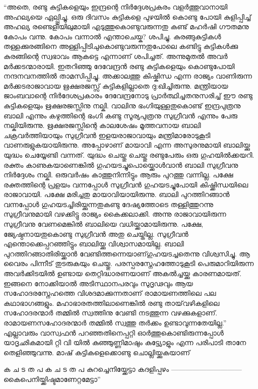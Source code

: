 “അതെ, രണ്ടു കുട്ടികളെയും ഇന്ദ്രന്റെ നിർദ്ദേശപ്രകരം വളർത്തുവാനായി അഹല്യയെ ഏല്പ്പിച്ചു. ഒരു ദിവസം കുട്ടികളെ പുഴയിൽ കൊണ്ടു പോയി കുളിപ്പിച്ച് അഹല്യ രണ്ടെളിയിലുമായി എടുത്തുകൊണ്ടുവരുന്നതു കണ്ട് മഹർഷി ഗൗതമനു കോപം വന്നു. കോപം വന്നാൽ എന്താചെയ്ക? ശപിച്ചു. കുരങ്ങുകുട്ടികൾ തള്ളക്കുരങ്ങിനെ അള്ളിപ്പിടിചുകൊണ്ടുവരുന്നതുപോലെ കണ്ടിട്ടു കുട്ടികൾക്കു കുരങ്ങിന്റെ സ്വഭാവം ആകട്ടെ എന്നാണ്‌ ശപിച്ചത്. അന്നുമുതൽ അവർ മർക്കടന്മാരായി. ഇതറിഞ്ഞു ദേവേന്ദ്രൻ രണ്ടു കുട്ടികളെയും കൊണ്ടുപോയി നന്ദനവനത്തിൽ താമസിപ്പിച്ചു. അക്കാലത്തു കിഷ്കിന്ധ എന്ന രാജ്യം വാണിരുന്ന മർക്കടരാജാവായ ഋക്ഷരജസ്സ് കുട്ടികളില്ലാതെ ദു:ഖിച്ചിരുന്നു. മന്ത്രിയായ ജാംബവാന്റെ നിർദേശപ്രകാരം ദേവേന്ദ്രനോടു പ്രാർത്ഥിച്ചതനുസരിച്ച് ഈ രണ്ടു കുട്ടികളെയും ഋക്ഷരജസ്സിനു നല്കി. വാലിനു ഭംഗിയുള്ളതുകൊണ്ട് ഇന്ദ്രപുത്രനു ബാലി എന്നും കഴുത്തിന്റെ ഭംഗി കണ്ടു സൂര്യപുത്രനു സുഗ്രീവൻ എന്നും പേരു നല്കിയിരുന്നു. ഋക്ഷരജസ്സിന്റെ കാലശേഷം മൂത്തവനായ ബാലി ചക്രവർത്തിയായും സുഗ്രീവൻ ഇളയരാജാവായും മന്ത്രിമാരോടുകൂടി വാണരുളുകയായിരുന്നു. അപ്പോഴാണ്‌ മായാവി എന്ന അസുരനുമായി ബാലിയ്ക്കു യുദ്ധം ചെയ്യേണ്ടി വന്നത്. യുദ്ധം ചെയ്തു ചെയ്തു രണ്ടുപേരും ഒരു ഗുഹയിൽക്കയറി. രക്തം കാണുകയാണെങ്കിൽ ഗുഹയടച്ചുപൊയ്ക്കൊൾവാൻ ബാലി സുഗ്രീവനു നിർദ്ദേശം നല്കി. ഒരുവർഷം കാത്തുനിന്നിട്ടും ആരും പുറത്തു വന്നില്ല. പക്ഷേ രക്തത്തിന്റെ പ്രളയം വന്നപ്പോൾ സുഗ്രീവൻ ഗുഹയടച്ചുപോയി കിഷ്ക്കിന്ധയിലെ രാജാവായി. പക്ഷേ മരിച്ചതു മായാവിയായിരുന്നു. ബാലി പുറത്തിറങ്ങാൻ വന്നപ്പോൾ ഗുഹയടച്ചിരിയ്ക്കുന്നതുകണ്ടു ദേഷ്യത്തോടെ തള്ളിത്തുറന്നു സുഗ്രീവനുമായി വഴക്കിട്ടു രാജ്യം കൈക്കലാക്കി. അന്നു രാജാവായിരുന്ന സുഗ്രീവനു വേണമെങ്കിൽ ബാലിയെ വധിയ്ക്കാമായിരുന്നു. പക്ഷേ, ജ്യേഷ്ഠനായതുകൊണ്ടു സുഗ്രീവൻ അതു ചെയ്തില്ല. സുഗ്രീവൻ എന്തൊക്കെപ്പറഞ്ഞിട്ടും ബാലിയ്ക്കു വിശ്വാസമായില്ല. ബാലി പുറത്തിറങ്ങാതിരിയ്ക്കാൻ വേണ്ടിത്തന്നെയാണ്‌ഗുഹയടച്ചതെന്നു വിശ്വസിച്ചു. ആ വൈരം പിന്നീട് തുടരുകയും ചെയ്തു. പരസ്പരസ്നേഹത്തോടുകൂടി പെരുമാറിയിരുന്ന അവർക്കിടയിൽ ഉണ്ടായ തെറ്റിദ്ധാരണയാണ് അകൽച്ചയ്ക്കു കാരണമായത്.
ഇങ്ങനെ നോക്കിയാൽ അടിസ്ഥാനപരവും സുദൃഢവും ആയ സഹോദരസ്നേഹത്തെ വിശദമാക്കുന്നതാണ് രാമായണത്തിലെ പല കഥാഭാഗങ്ങളും. മഹാഭാരതത്തിലാണെങ്കിൽ രണ്ടു തായ്‌വഴികളിലെ സഹോദരന്മാർ തമ്മിൽ സ്വത്തിനു വേണ്ടി നടത്തുന്ന വഴക്കുകളാണ്. രാമായണസഹോദരന്മാർ തമ്മിൽ സ്വത്തു തർക്കം ഉണ്ടാവുന്നതേയില്ല.”
എല്ലാവരും വാസ്വഫൻ പറഞ്ഞതിനെപ്പറ്റി ഓർത്തുകൊണ്ടിരുന്നപ്പോൾ യാദൃഛികമായി റ്റി വി യിൽ കുഞ്ഞുണ്ണിമാഷും കുട്ട്യോളും എന്ന പരിപാടി താനേ തെളിഞ്ഞുവന്നു. മാഷ് കുട്ടികളെക്കൊണ്ടു ചൊല്ലിയ്ക്കുകയാണ്‌

\begin{minipage}{\textwidth}
ക ച ട ത പ ക ച ട ത പ
കുറച്ചെനിയ്ക്കേട്ടാ കദളിപ്പഴം
------------------------------
കൈപെനിയ്ക്കിഷ്ടമാണേറ്റമേട്ടാ”
\end{minipage}
